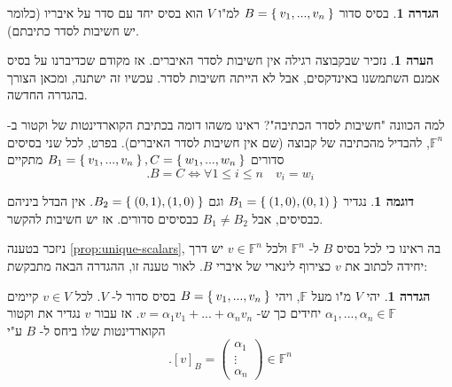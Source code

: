 \documentclass[12pt]{report}
\theoremstyle{plain}
\theoremstyle{definition}
\newtheorem{definition}[theorem]{הגדרה}
\newtheorem{example}{דוגמה}[chapter]
\newtheorem{remark}{הערה}[chapter]
\newcommand{\F}{\mathbb{F}}
\newcommand{\0}{\mathbf{0}}
\begin{document}
\begin{definition}
בסיס סדור 
$B=\Set{v_1,...,v_n}$
למ"ו
$V$
הוא בסיס יחד עם סדר על איבריו (כלומר יש חשיבות לסדר כתיבתם).
\end{definition}

\begin{remark}
נזכיר שבקבוצה רגילה אין חשיבות לסדר האיברים. אז מקודם שכדיברנו על בסיס אמנם השתמשנו באינדקסים, אבל לא הייתה חשיבות לסדר. עכשיו זה ישתנה, ומכאן הצורך בהגדרה החדשה.

למה הכוונה "חשיבות לסדר הכתיבה"? ראינו משהו דומה בכתיבת הקוארדינטות של וקטור ב-
$\F^n$,
להבדיל מהכתיבה של קבוצה (שם אין חשיבות לסדר האיברים). בפרט, לכל שני בסיסים סדורים
$B_1=\Set{v_1,...,v_n},C=\Set{w_1,...,w_n}$
מתקיים
$$
.B=C \iff \forall 1\leq i \leq n \quad v_i=w_i
$$

\end{remark}

\begin{example}
נגדיר
$B_1=\Set{(1,0),(0,1)}$
וגם 
$B_2=\Set{(0,1),(1,0)}$.
אין הבדל ביניהם כבסיסים, אבל 
$B_1\neq B_2$
כבסיסים סדורים. אז יש חשיבות להקשר.
\end{example}

ניזכר בטענה
\ref{prop:unique-scalars},
בה ראינו כי לכל בסיס
$B$
ל-
$\F^n$
ולכל
$v\in\F^n$
יש דרך יחידה לכתוב את 
$v$
כצירוף לינארי של איברי 
$B$.
לאור טענה זו, ההגדרה הבאה מתבקשת:

\begin{definition}
יהי 
$V$
מ"ו מעל
$\F$,
ויהי
$B=\Set{v_1,...,v_n}$
בסיס סדור ל-
$V$.
לכל 
$v\in V$
קיימים
$\alpha_1,...,\alpha_n\in\F$
יחידים כך ש-
$v=\alpha_1v_1+...+\alpha_nv_n$.
אז עבור 
$v$
נגדיר את וקטור הקוארדינטות שלו ביחס
ל-
$B$
ע"י
$$
.[v]_B=\begin{pmatrix}
\alpha_1 \\
\vdots \\
\alpha_n
\end{pmatrix}\in\F^n
$$
\end{definition}
\end{document}
